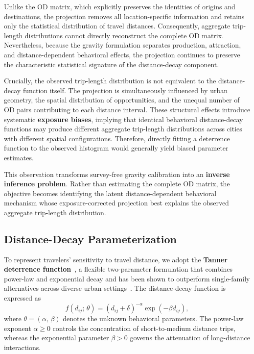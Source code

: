 Unlike the OD matrix, which explicitly preserves the identities of origins and destinations, the projection removes all location-specific information and retains only the statistical distribution of travel distances. Consequently, aggregate trip-length distributions cannot directly reconstruct the complete OD matrix. Nevertheless, because the gravity formulation separates production, attraction, and distance-dependent behavioral effects, the projection continues to preserve the characteristic statistical signature of the distance-decay component.

Crucially, the observed trip-length distribution is not equivalent to the distance-decay function itself. The projection is simultaneously influenced by urban geometry, the spatial distribution of opportunities, and the unequal number of OD pairs contributing to each distance interval. These structural effects introduce systematic \textbf{exposure biases}, implying that identical behavioral distance-decay functions may produce different aggregate trip-length distributions across cities with different spatial configurations. Therefore, directly fitting a deterrence function to the observed histogram would generally yield biased parameter estimates.

This observation transforms survey-free gravity calibration into an \textbf{inverse inference problem}. Rather than estimating the complete OD matrix, the objective becomes identifying the latent distance-dependent behavioral mechanism whose exposure-corrected projection best explains the observed aggregate trip-length distribution.

\subsection{Distance-Decay Parameterization}\label{sec:decay_function}

To represent travelers' sensitivity to travel distance, we adopt the \textbf{Tanner deterrence function}~\citep{tanner1961,feldman2012alternative}, a flexible two-parameter formulation that combines power-law and exponential decay and has been shown to outperform single-family alternatives across diverse urban settings~\citep{verma2025determinants}. The distance-decay function is expressed as
\begin{equation}\label{eq:tanner_multi}
f(d_{ij};\,\theta) = (d_{ij} + \delta)^{-\alpha} \exp(-\beta d_{ij}),
\end{equation}
where $\theta = (\alpha,\, \beta)$ denotes the unknown behavioral parameters. The power-law exponent $\alpha \ge 0$ controls the concentration of short-to-medium distance trips, whereas the exponential parameter $\beta > 0$ governs the attenuation of long-distance interactions.

